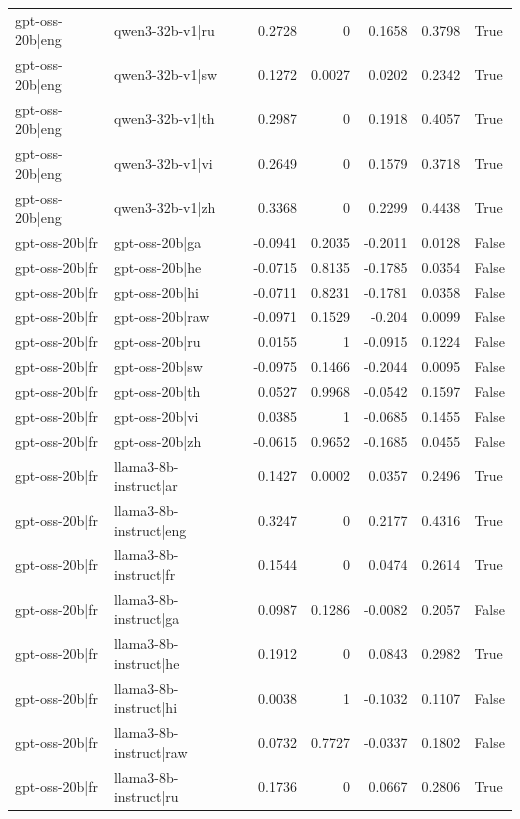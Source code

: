 \begin{table}
\begin{tabular}{l l r r r r l}
gpt-oss-20b|eng & qwen3-32b-v1|ru & 0.2728 & 0 & 0.1658 & 0.3798 & True \\
gpt-oss-20b|eng & qwen3-32b-v1|sw & 0.1272 & 0.0027 & 0.0202 & 0.2342 & True \\
gpt-oss-20b|eng & qwen3-32b-v1|th & 0.2987 & 0 & 0.1918 & 0.4057 & True \\
gpt-oss-20b|eng & qwen3-32b-v1|vi & 0.2649 & 0 & 0.1579 & 0.3718 & True \\
gpt-oss-20b|eng & qwen3-32b-v1|zh & 0.3368 & 0 & 0.2299 & 0.4438 & True \\
gpt-oss-20b|fr & gpt-oss-20b|ga & -0.0941 & 0.2035 & -0.2011 & 0.0128 & False \\
gpt-oss-20b|fr & gpt-oss-20b|he & -0.0715 & 0.8135 & -0.1785 & 0.0354 & False \\
gpt-oss-20b|fr & gpt-oss-20b|hi & -0.0711 & 0.8231 & -0.1781 & 0.0358 & False \\
gpt-oss-20b|fr & gpt-oss-20b|raw & -0.0971 & 0.1529 & -0.204 & 0.0099 & False \\
gpt-oss-20b|fr & gpt-oss-20b|ru & 0.0155 & 1 & -0.0915 & 0.1224 & False \\
gpt-oss-20b|fr & gpt-oss-20b|sw & -0.0975 & 0.1466 & -0.2044 & 0.0095 & False \\
gpt-oss-20b|fr & gpt-oss-20b|th & 0.0527 & 0.9968 & -0.0542 & 0.1597 & False \\
gpt-oss-20b|fr & gpt-oss-20b|vi & 0.0385 & 1 & -0.0685 & 0.1455 & False \\
gpt-oss-20b|fr & gpt-oss-20b|zh & -0.0615 & 0.9652 & -0.1685 & 0.0455 & False \\
gpt-oss-20b|fr & llama3-8b-instruct|ar & 0.1427 & 0.0002 & 0.0357 & 0.2496 & True \\
gpt-oss-20b|fr & llama3-8b-instruct|eng & 0.3247 & 0 & 0.2177 & 0.4316 & True \\
gpt-oss-20b|fr & llama3-8b-instruct|fr & 0.1544 & 0 & 0.0474 & 0.2614 & True \\
gpt-oss-20b|fr & llama3-8b-instruct|ga & 0.0987 & 0.1286 & -0.0082 & 0.2057 & False \\
gpt-oss-20b|fr & llama3-8b-instruct|he & 0.1912 & 0 & 0.0843 & 0.2982 & True \\
gpt-oss-20b|fr & llama3-8b-instruct|hi & 0.0038 & 1 & -0.1032 & 0.1107 & False \\
gpt-oss-20b|fr & llama3-8b-instruct|raw & 0.0732 & 0.7727 & -0.0337 & 0.1802 & False \\
gpt-oss-20b|fr & llama3-8b-instruct|ru & 0.1736 & 0 & 0.0667 & 0.2806 & True \\

\end{tabular}
\end{table}

